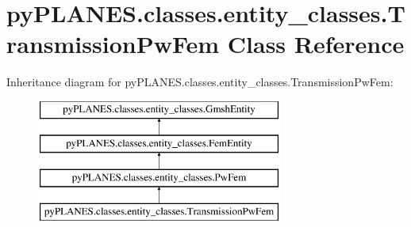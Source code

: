 \hypertarget{classpy_p_l_a_n_e_s_1_1classes_1_1entity__classes_1_1_transmission_pw_fem}{}\section{py\+P\+L\+A\+N\+E\+S.\+classes.\+entity\+\_\+classes.\+Transmission\+Pw\+Fem Class Reference}
\label{classpy_p_l_a_n_e_s_1_1classes_1_1entity__classes_1_1_transmission_pw_fem}
Inheritance diagram for py\+P\+L\+A\+N\+E\+S.\+classes.\+entity\+\_\+classes.\+Transmission\+Pw\+Fem\+:\begin{figure}[H]
\begin{center}
\leavevmode
\includegraphics[height=4.000000cm]{classpy_p_l_a_n_e_s_1_1classes_1_1entity__classes_1_1_transmission_pw_fem}
\end{center}
\end{figure}
